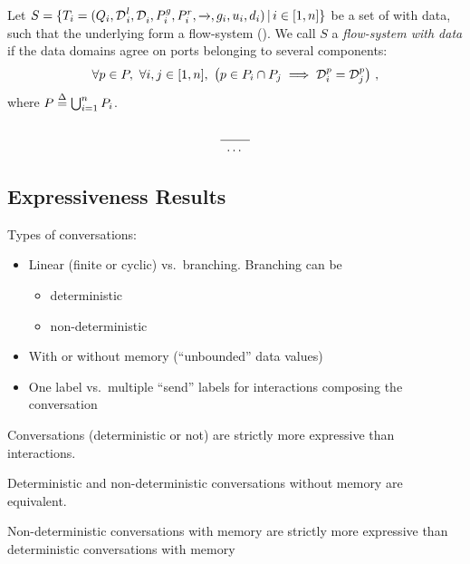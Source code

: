\begin{definition}
  \label{defn:data:composition}
  Let $S = \{{T_i = (Q_i, {\mathcal{D}^{}}^{l}_i, \mathcal{D}^{}_i, {P}^{g}_i,
    {P}^{r}_i, \xrightarrow[]{}, g_i, u_i, d_i)}\,|\,{i \in [1,n]}\}$ be a
  set of \compmodel{} with data, such that the underlying \compmodel{}
  form a flow-system ().  We call $S$ a
  \emph{flow-system with data} if the data domains agree on ports
  belonging to several components:
  \begin{equation}
    \label{eq:data:coherency}
    \forall p \in P,\ \forall i,j \in [1,n],\ 
    \left(
    p \in P_i \cap P_j \implies \data[p]_i = \data[p]_j
    \right)\,,
  \end{equation}
  where $P \stackrel{\Delta}{=} \bigcup_{i=1}^n P_i$.

  \begin{equation}
    \label{eq:data:composition}
    \derrule{
      
    }{      
      \dots
    }
  \end{equation}
\end{definition}


\subsection{Expressiveness Results}
\label{sec:expressiveness}


Types of conversations:
\begin{itemize}
\item Linear (finite or cyclic) vs.\ branching.  Branching can be
  \begin{itemize}
  \item deterministic
  \item non-deterministic
  \end{itemize}
\item With or without memory (``unbounded'' data values)
\item One label vs.\ multiple ``send'' labels for interactions composing
  the conversation
\end{itemize}

Conversations (deterministic or not) are strictly more expressive than
interactions.

Deterministic and non-deterministic conversations without memory are
equivalent.

Non-deterministic conversations with memory are strictly more expressive
than deterministic conversations with memory
